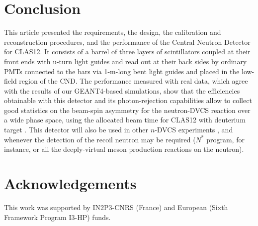 \section{Conclusion}
This article presented the requirements, the design, the calibration and reconstruction procedures, and the performance of the Central Neutron Detector for CLAS12. It consists of a barrel of three layers of scintillators coupled at their front ends with u-turn light guides and read out at their back sides by ordinary PMTs connected to the bars via 1-m-long bent light guides and placed in the low-field region of the CND. 
The performance measured with real data, which agree with the results of our GEANT4-based simulations, show that the efficiencies obtainable with this detector and its photon-rejection capabilities allow to collect good statistics on the beam-spin asymmetry for the neutron-DVCS reaction over a wide phase space, using the allocated beam time for CLAS12 with deuterium target \cite{Jlab12_CLAS_n}. This detector will also be used in other $n$-DVCS experiments \cite{Jlab12_CLAS_n_pol}, and whenever the detection of the recoil neutron may be required ($N^*$ program, for instance, or all the deeply-virtual meson production reactions on the neutron). 
\section{Acknowledgements}
This work was supported by IN2P3-CNRS (France) and European (Sixth Framework Program I3-HP) funds. 




